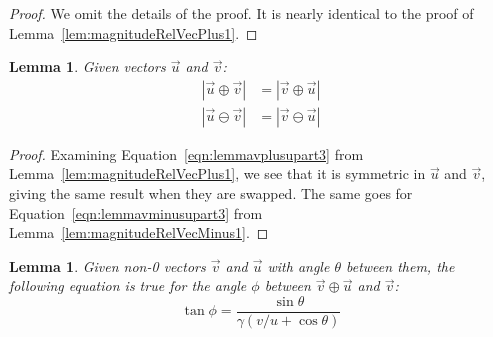\documentclass[a4paper]{article}
\theoremstyle{plain}
\newtheorem{lemma}[theorem]{Lemma}
\theoremstyle{definition}
\newcommand{\vect}[1]{\vec{#1}}
\begin{document}
\begin{proof}
We omit the details of the proof.  It is nearly identical
to the proof of Lemma~\ref{lem:magnitudeRelVecPlus1}.
\end{proof}

\begin{lemma}
\label{lem:magnitudeRelVecPlusMinus}
Given vectors $\vect{u}$ and $\vect{v}$:
\begin{align*}
|\vect{u} \oplus \vect{v}| & = |\vect{v} \oplus \vect{u}| \\
|\vect{u} \ominus \vect{v}| & = |\vect{v} \ominus \vect{u}|
\end{align*}
\end{lemma}

\begin{proof}
Examining Equation~\eqref{eqn:lemmavplusupart3} from
Lemma~\ref{lem:magnitudeRelVecPlus1}, we see that it is symmetric in
$\vect{u}$ and $\vect{v}$, giving the same result when they are
swapped.
The same goes for Equation~\eqref{eqn:lemmavminusupart3} from
Lemma~\ref{lem:magnitudeRelVecMinus1}.
\end{proof}

\begin{lemma}
\label{lem:angleBetweenVplusUandV}
Given non-0 vectors $\vect{v}$ and $\vect{u}$
with angle $\theta$ between them,
the following equation is true for the angle $\phi$ between
$\vect{v} \oplus \vect{u}$ and $\vect{v}$:
\begin{equation}
\tan \phi = \frac{\sin \theta}{\gamma(v/u + \cos \theta)}
\end{equation}
\end{lemma}
\end{document}
